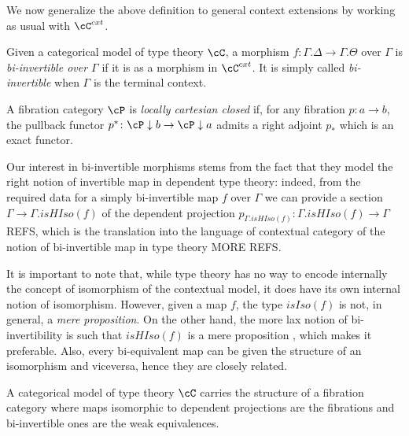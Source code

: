 We now generalize the above definition to general context extensions by working
as usual with $\cC^{cxt}$.

\begin{defn}
  Given a categorical model of type theory $\cC$, a morphism
  $f\colon\Gamma.\Delta\rightarrow\Gamma.\Theta$ over $\Gamma$ is
  \emph{bi-invertible over $\Gamma$} if it is as a morphism in $\cC^{cxt}$. It
  is simply called \emph{bi-invertible} when $\Gamma$ is the terminal
  context.
\end{defn}

\begin{defn}
  A fibration category $\cP$ is \emph{locally cartesian closed} if, for any
  fibration $p\colon a\rightarrow b$, the pullback functor
  $p^*\colon\cP\downarrow b\rightarrow\cP\downarrow a$ admits a right adjoint
  $p_*$ which is an exact functor.
\end{defn}

\begin{rmk}
  Our interest in bi-invertible morphisms stems from the fact that they model
  the right notion of invertible map in dependent type theory: indeed, from the
  required data for a simply bi-invertible map $f$ over $\Gamma$ we can provide
  a section $\Gamma\rightarrow\Gamma. isHIso(f)$ of the dependent projection
  $p_{\Gamma.isHIso(f)}\colon\Gamma.isHIso(f)\rightarrow\Gamma$ REFS, which is
  the translation into the language of contextual category of the notion of
  bi-invertible map in type theory MORE REFS.

  It is important to note that, while type theory has no way to encode
  internally the concept of isomorphism of the contextual model, it does have
  its own internal notion of isomorphism. However, given a map $f$, the type
  $isIso(f)$ is not, in general, a \emph{mere proposition}. On the other hand,
  the more lax notion of bi-invertibility is such that $isHIso(f)$ is a mere
  proposition , which makes it
  preferable. Also, every bi-equivalent map can be given the structure of an
  isomorphism and viceversa, hence they are closely related.
\end{rmk}

\begin{prop}
  A categorical model of type theory $\cC$ carries the structure of a fibration
  category where maps isomorphic to dependent projections are the fibrations and
  bi-invertible ones are the weak equivalences.
\end{prop}

